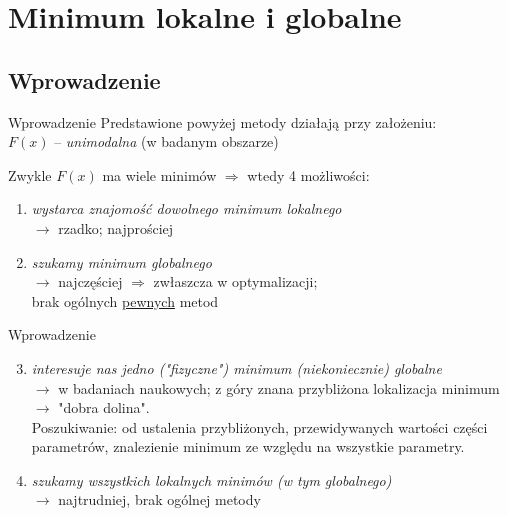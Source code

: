 \section{Minimum lokalne i globalne}

\subsection{Wprowadzenie}

  \begin{frame}{Wprowadzenie}
    Predstawione powyżej metody działają przy założeniu:\\
    $F(x)$ -- \emph{unimodalna} (w badanym obszarze)
    \begin{block}{Zwykle $F(x)$ ma wiele minimów $\Rightarrow$ wtedy 4 możliwości:}
      \begin{enumerate}
        \item \emph{wystarca znajomość dowolnego minimum lokalnego}\\
        $\to$ rzadko; najprościej
        \item \emph{szukamy minimum globalnego}\\
        $\to$ najczęściej $\Rightarrow$ zwłaszcza w optymalizacji;\\
        brak ogólnych \underline{pewnych} metod

      \end{enumerate}
    \end{block}
  \end{frame}

  \begin{frame}{Wprowadzenie}
    \begin{block}{}
      \begin{enumerate}
        \setcounter{enumi}{2}
        \item \emph{interesuje nas jedno ("fizyczne") minimum
        (niekoniecznie) globalne}\\
        $\to$ w badaniach naukowych; z góry znana przybliżona
        lokalizacja minimum $\to$ "dobra dolina". \\
        Poszukiwanie: od ustalenia przybliżonych, przewidywanych
        wartości części parametrów, znalezienie minimum ze
        względu na wszystkie parametry.
        \item \emph{szukamy wszystkich lokalnych minimów
        (w tym globalnego)} \\
        $\to$ najtrudniej, brak ogólnej metody
      \end{enumerate}
    \end{block}
  \end{frame}

